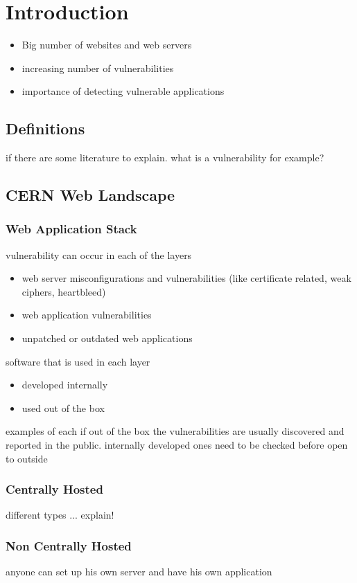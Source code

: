 \chapter{Introduction}
\thispagestyle{empty}

\begin{itemize}
\item Big number of websites and web servers
\item increasing number of vulnerabilities
\item importance of detecting vulnerable applications
\end{itemize}

\section{Definitions}
if there are some literature to explain. what is a vulnerability for example?
\section{CERN Web Landscape}
\subsection{Web Application Stack}
vulnerability can occur in each of the layers
\begin{itemize}
\item web server misconfigurations and vulnerabilities (like certificate related, weak ciphers, heartbleed) 
\item web application vulnerabilities
\item unpatched or outdated web applications
\end{itemize}


software that is used in each layer
\begin{itemize}
\item developed internally
\item used out of the box
\end{itemize}
examples of each
if out of the box the vulnerabilities are usually discovered and reported in the public.
internally developed ones need to be checked before open to outside

\subsection{Centrally Hosted}
different types ... explain!
\subsection{Non Centrally Hosted}
anyone can set up his own server and have his own application

